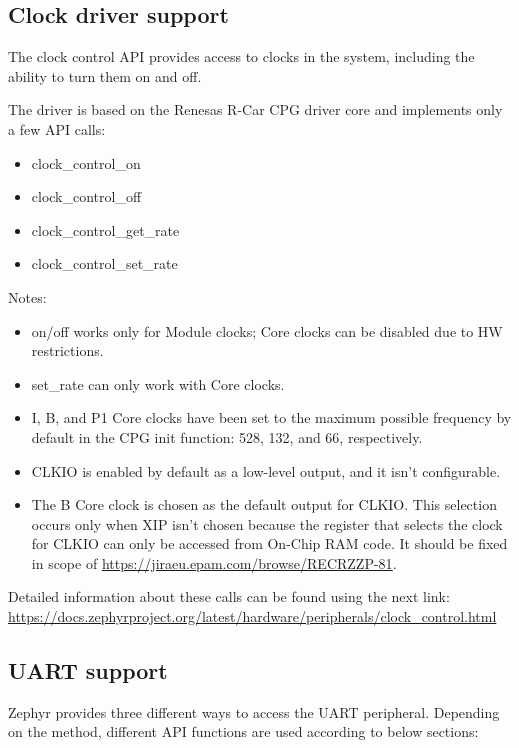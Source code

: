 \documentclass[11pt,a4paper,oneside]{article}
\begin{document}
\subsection{Clock driver support}\label{clock-driver-support}

The clock control API provides access to clocks in the system, including
the ability to turn them on and off.

The driver is based on the Renesas R-Car CPG driver core and implements
only a few API calls:
\begin{itemize}
  \item
    clock\_control\_on
  \item
    clock\_control\_off
  \item
    clock\_control\_get\_rate
  \item
    clock\_control\_set\_rate
\end{itemize}

Notes:
\begin{itemize}
  \item
    on/off works only for Module clocks; Core clocks can be disabled due to HW restrictions.
  \item
    set\_rate can only work with Core clocks.
  \item
    I, B, and P1 Core clocks have been set to the maximum possible frequency by default in the
    CPG init function: 528, 132, and 66, respectively.
  \item
    CLKIO is enabled by default as a low-level output, and it isn't configurable.
  \item
    The B Core clock is chosen as the default output for CLKIO. This selection occurs only when
    XIP isn't chosen because the register that selects the clock for CLKIO can only be accessed from
    On-Chip RAM code. It should be fixed in scope of \url{https://jiraeu.epam.com/browse/RECRZZP-81}.
\end{itemize}

Detailed information about these calls can be found using the next link:
\url{https://docs.zephyrproject.org/latest/hardware/peripherals/clock_control.html}

\subsection{UART support}\label{uart-support}

Zephyr provides three different ways to access the UART peripheral.
Depending on the method, different API functions are used according to
below sections:
\end{document}
